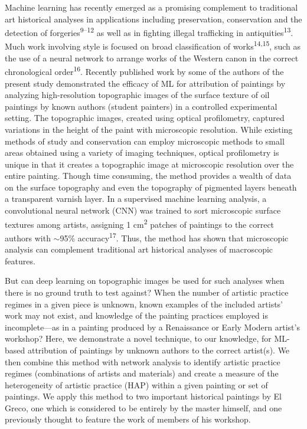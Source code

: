 \documentclass[11pt]{article}
\begin{document}
Machine learning has recently emerged as a promising complement to
traditional art historical analyses in applications including
preservation, conservation and the detection of forgeries\textsuperscript{9--12} as well as in fighting illegal trafficking in
antiquities\textsuperscript{13}. Much work involving style is focused on
broad classification of works\textsuperscript{14,15}, such as the use of
a neural network to arrange works of the Western canon in the correct
chronological order\textsuperscript{16}. Recently published work by some
of the authors of the present study demonstrated the efficacy of ML for
attribution of paintings by analyzing high-resolution topographic images
of the surface texture of oil paintings by known authors (student
painters) in a controlled experimental setting. The topographic images,
created using optical profilometry, captured variations in the height of
the paint with microscopic resolution. While existing methods of study
and conservation can employ microscopic methods to small areas obtained
using a variety of imaging techniques, optical profilometry is unique in
that it creates a topographic image at microscopic resolution over the
entire painting. Though time consuming, the method provides a wealth of
data on the surface topography and even the topography of pigmented
layers beneath a transparent varnish layer. In a supervised machine
learning analysis, a convolutional neural network (CNN) was trained to
sort microscopic surface textures among artists, assigning 1
cm\textsuperscript{2} patches of paintings to the correct authors with
$\sim$95\% accuracy\textsuperscript{17}. Thus, the method has
shown that microscopic analysis can complement traditional art
historical analyses of macroscopic features.

But can deep learning on topographic images be used for such analyses
when there is no ground truth to test against? When the number of
artistic practice regimes in a given piece is unknown, known examples of
the included artists' work may not exist, and knowledge of the painting
practices employed is incomplete---as in a painting produced by a
Renaissance or Early Modern artist's workshop? Here, we demonstrate a
novel technique, to our knowledge, for ML-based attribution of paintings
by unknown authors to the correct artist(s). We then combine this method
with network analysis to identify artistic practice regimes
(combinations of artists and materials) and create a measure of the
heterogeneity of artistic practice (HAP) within a given painting or set
of paintings. We apply this method to two important historical paintings
by El Greco, one which is considered to be entirely by the master
himself, and one previously thought to feature the work of members of
his workshop.
\end{document}
